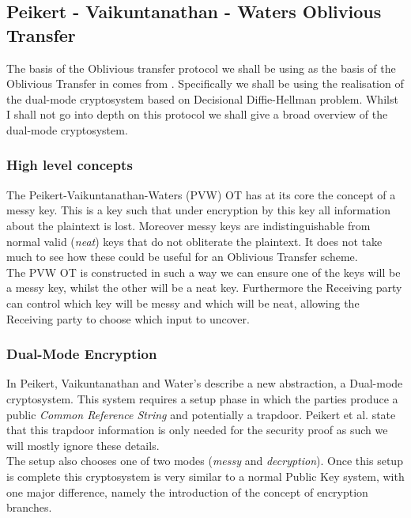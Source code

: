 \documentclass[ %
                    author={Nicholas Tutte},
                supervisor={Prof. Nigel Smart},
                    degree={MEng},
                     title={Secure Two Party Computation},
                  subtitle={A practical comparison of recent protocols},
                      type={Research - GG1K},
                      year={2015} ]{dissertation}
\begin{document}
			\subsection{Peikert - Vaikuntanathan - Waters Oblivious Transfer} \label{sub:dualModeCryptoOT}
				The basis of the Oblivious transfer protocol we shall be using as the basis of the Oblivious Transfer in \cite{LindellAndPinkas2011, Lindell_CnC_2013} comes from \cite{PVW_OT_2008}. Specifically we shall be using the realisation of the dual-mode cryptosystem based on Decisional Diffie-Hellman problem. Whilst I shall not go into depth on this protocol we shall give a broad overview of the dual-mode cryptosystem.

				\subsubsection{High level concepts}
					The Peikert-Vaikuntanathan-Waters (PVW) OT has at its core the concept of a messy key. This is a key such that under encryption by this key all information about the plaintext is lost. Moreover messy keys are indistinguishable from normal valid (\emph{neat}) keys that do not obliterate the plaintext. It does not take much to see how these could be useful for an Oblivious Transfer scheme.\\

					The PVW OT is constructed in such a way we can ensure one of the keys will be a messy key, whilst the other will be a neat key. Furthermore the Receiving party can control which key will be messy and which will be neat, allowing the Receiving party to choose which input to uncover.

				\subsubsection{Dual-Mode Encryption}
					In \cite{PVW_OT_2008} Peikert, Vaikuntanathan and Water's describe a new abstraction, a Dual-mode cryptosystem. This system requires a setup phase in which the parties produce a public \emph{Common Reference String} and potentially a trapdoor. Peikert et al. state that this trapdoor information is only needed for the security proof as such we will mostly ignore these details.\\

					The setup also chooses one of two modes (\emph{messy} and \emph{decryption}). Once this setup is complete this cryptosystem is very similar to a normal Public Key system, with one major difference, namely the introduction of the concept of encryption branches.\\
\end{document}
